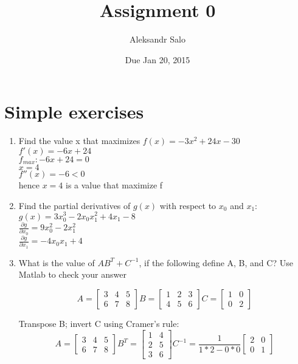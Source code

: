 \documentclass{article}
\title{Assignment 0}
\date{Due Jan 20, 2015}
\author{Aleksandr Salo}
\begin{document}
\maketitle

\section*{Simple exercises}
	\begin{enumerate}
		\item  Find the value x that maximizes $f(x) = -3x^2 + 24x - 30$\\
		$f'(x) = -6x + 24$\\
		$f_{max}: -6x + 24 = 0$\\
		$x = 4$\\
		$f''(x) = -6 < 0$\\
		hence $x = 4$ is a value that maximize f
		
		
		\item Find the partial derivatives of $g(x)$ with respect to $x_0$ and $x_1$: $g(x) = 3x^3_0 - 2x_0x^2_1 + 4x_1 - 8$\\
		$\frac{\partial g}{\partial x_0} = 9x^2_0 - 2x^2_1$\\
		$\frac{\partial g}{\partial x_1} = -4x_0x_1 + 4$\\	
		
		\item What is the value of $AB^T + C^{-1}$, if the following define A, B, and C? Use Matlab to check your
		answer
		
		\[
			A =	\begin{bmatrix}
			3 & 4 & 5\\
			6 & 7 & 8
			\end{bmatrix}			
			B =	\begin{bmatrix}
			1 & 2 & 3\\
			4 & 5 & 6
			\end{bmatrix}			
			C =	\begin{bmatrix}
			1 & 0\\
			0 & 2
			\end{bmatrix}	
		\]
		
		Transpose B; invert C using Cramer's rule:		
		\[
		A =	\begin{bmatrix}
		3 & 4 & 5\\
		6 & 7 & 8
		\end{bmatrix}		
		B^T =	\begin{bmatrix}
		1 & 4\\
		2 & 5\\
		3 & 6
		\end{bmatrix}			
		C^{-1} = \frac{1}{1*2 - 0*0}\begin{bmatrix}
		2 & 0\\
		0 & 1
		\end{bmatrix}			
		\]
		

\end{enumerate}
\end{document}
